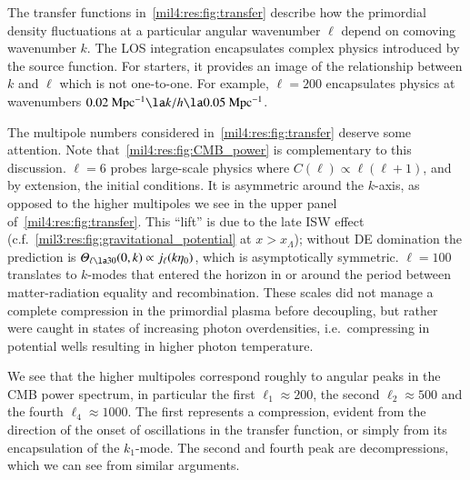 



The transfer functions in~\cref{mil4:res:fig:transfer} describe how the primordial density fluctuations at a particular angular wavenumber $\ell$ depend on comoving wavenumber $k$. The LOS integration encapsulates complex physics introduced by the source function. For starters, it provides an image of the relationship between $k$ and $\ell$ which is not one-to-one. For example, $\ell=200$ encapsulates physics at wavenumbers $0.02\unit{Mpc^{-1}} \la k/h \la 0.05\unit{Mpc^{-1}}$.

The multipole numbers considered in~\cref{mil4:res:fig:transfer} deserve some attention. Note that~\cref{mil4:res:fig:CMB_power} is complementary to this discussion. $\ell=6$ probes large-scale physics where $C(\ell) \propto \ell(\ell+1)$, and by extension, the initial conditions. It is asymmetric around the $k$-axis, as opposed to the higher multipoles we see in the upper panel of~\cref{mil4:res:fig:transfer}. This ``lift'' is due to the late ISW effect (c.f.~\cref{mil3:res:fig:gravitational_potential} at $x>x_\Lambda$); without DE domination the prediction is $\Theta_{\ell\la 30}(0, k)\propto j_\ell(k\eta_0)$, which is asymptotically symmetric. $\ell=100$ translates to $k$-modes that entered the horizon in or around the period between matter-radiation equality and recombination. These scales did not manage a complete compression in the primordial plasma before decoupling, but rather were caught in states of increasing photon overdensities, i.e.~compressing in potential wells resulting in higher photon temperature.  

We see that the higher multipoles correspond roughly to angular peaks in the CMB power spectrum, in particular the first $\ell_1 \approx 200$, the second $\ell_2 \approx 500$ and the fourth $\ell_4\approx 1000$. The first represents a compression, evident from the direction of the onset of oscillations in the transfer function, or simply from its encapsulation of the $k_1$-mode. The second and fourth peak are decompressions, which we can see from similar arguments.



